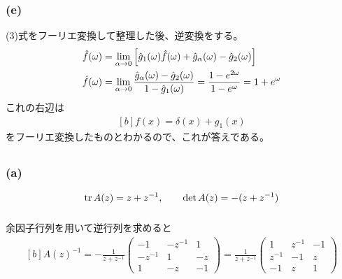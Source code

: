 \documentclass[../../sp_2023.tex]{subfiles}
\begin{document}
\subsubsection{(e)}
(3)式をフーリエ変換して整理した後、逆変換をする。
\begin{equation}\begin{aligned}[b]
    \hat{f}(\omega) &= \lim_{\alpha\to0} \qty[\hat{g}_1(\omega)\hat{f}(\omega)+\hat{g}_\alpha(\omega)-\hat{g}_2(\omega)]\\
    \hat{f}(\omega) &= \lim_{\alpha\to0}\frac{\hat{g}_\alpha(\omega)-\hat{g}_2(\omega)}{1-\hat{g}_1(\omega)}
    = \frac{1-e^{2\omega}}{1-e^{\omega}}=1+e^{\omega}
\end{aligned}\end{equation}
これの右辺は
\begin{equation}\begin{aligned}[b]
    f(x)=\delta(x)+g_1(x)
\end{aligned}\end{equation}
をフーリエ変換したものとわかるので、これが答えである。

\subsection{}
\subsubsection{(a)}
\begin{equation}\begin{aligned}[b]
    \tr A(z)=z+z^{-1},\qquad \det A(z) = -(z+z^{-1})
\end{aligned}\end{equation}

\subsubsection{}
余因子行列を用いて逆行列を求めると
\begin{equation}\begin{aligned}[b]
    A(z)^{-1}=-\frac{1}{z+z^{-1}}\begin{pmatrix}
        -1 & -z^{-1} & 1\\
        -z^{-1} & 1 & -z\\
        1 & -z & -1
    \end{pmatrix}
    =\frac{1}{z+z^{-1}}\begin{pmatrix}
        1 & z^{-1} & -1\\
        z^{-1} & -1 & z\\
        -1 & z & 1
    \end{pmatrix}
\end{aligned}\end{equation}
\end{document}
